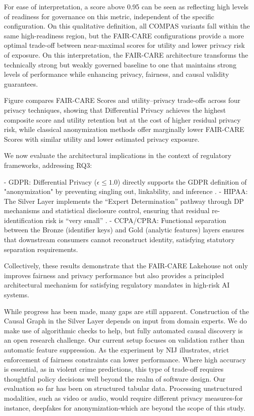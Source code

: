 For ease of interpretation, a score above 0.95 can be seen as reflecting high levels of readiness for governance on this metric, independent of the specific configuration. On this qualitative definition, all COMPAS variants fall within the same high-readiness region, but the FAIR-CARE configurations provide a more optimal trade-off between near-maximal scores for utility and lower privacy risk of exposure. On this interpretation, the FAIR-CARE architecture transforms the technically strong but weakly governed baseline to one that maintains strong levels of performance while enhancing privacy, fairness, and causal validity guarantees.

Figure  compares FAIR-CARE Scores and utility--privacy trade-offs across four privacy techniques, showing that Differential Privacy achieves the highest composite score and utility retention but at the cost of higher residual privacy risk, while classical anonymization methods offer marginally lower FAIR-CARE Scores with similar utility and lower estimated privacy exposure.

We now evaluate the architectural implications in the context of regulatory frameworks, addressing RQ3:

- GDPR: Differential Privacy ($\epsilon \le 1.0$) directly supports the GDPR definition of "anonymization" by preventing singling out, linkability, and inference .
- HIPAA: The Silver Layer implements the ``Expert Determination'' pathway through DP mechanisms and statistical disclosure control, ensuring that residual re-identification risk is ``very small'' .
- CCPA/CPRA: Functional separation between the Bronze (identifier keys) and Gold (analytic features) layers ensures that downstream consumers cannot reconstruct identity, satisfying statutory separation requirements.

Collectively, these results demonstrate that the FAIR-CARE Lakehouse not only improves fairness and privacy performance but also provides a principled architectural mechanism for satisfying regulatory mandates in high-risk AI systems.

While progress has been made, many gaps are still apparent. Construction of the Causal Graph in the Silver Layer depends on input from domain experts. We do make use of algorithmic checks to help, but fully automated causal discovery is an open research challenge. Our current setup focuses on validation rather than automatic feature suppression. As the experiment by NIJ illustrates, strict enforcement of fairness constraints can lower performance. Where high accuracy is essential, as in violent crime predictions, this type of trade-off requires thoughtful policy decisions well beyond the realm of software design. Our evaluation so far has been on structured tabular data. Processing unstructured modalities, such as video or audio, would require different privacy measures-for instance, deepfakes for anonymization-which are beyond the scope of this study.

